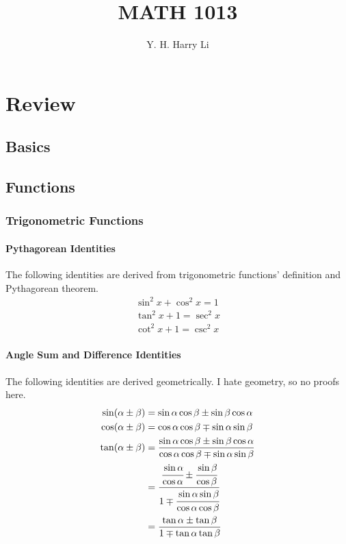 \documentclass{note}
\title{MATH 1013}
\author{Y. H. Harry Li}
\begin{document}
\maketitle

\tableofcontents
\newpage

\chapter{Review}
\section{Basics}
\section{Functions}

\subsection{Trigonometric Functions}

\subsubsection{Pythagorean Identities}

The following identities are derived from trigonometric functions' definition and Pythagorean theorem.
\begin{align*}
    \sin^2 x + \cos^2 x = 1 \\
    \tan^2 x + 1 = \sec^2 x \\
    \cot^2 x + 1 = \csc^2 x 
\end{align*}

\subsubsection{Angle Sum and Difference Identities}

The following identities are derived geometrically. I hate geometry, so no proofs here.
\begin{align*}
    \sin(\alpha\pm\beta) & = \sin\alpha\cos\beta \pm \sin\beta\cos\alpha \\
    \cos(\alpha\pm\beta) & = \cos\alpha\cos\beta \mp \sin\alpha\sin\beta \\
    \tan(\alpha\pm\beta) 
    & = \frac{\sin\alpha\cos\beta \pm \sin\beta\cos\alpha}{\cos\alpha\cos\beta \mp \sin\alpha\sin\beta} \\
    & = \cfrac{\cfrac{\sin\alpha}{\cos\alpha} \pm \cfrac{\sin\beta}{\cos\beta}}{1 \mp \cfrac{\sin\alpha\sin\beta}{\cos\alpha\cos\beta}} \\
    & = \frac{\tan\alpha \pm \tan\beta}{1 \mp \tan\alpha\tan\beta}
\end{align*}
\end{document}
